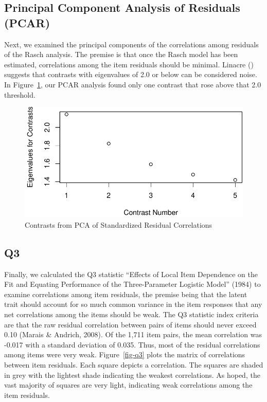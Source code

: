 \documentclass[
  letterpaper,
  DIV=11,
  numbers=noendperiod]{scrreport}
\begin{document}
\hypertarget{principal-component-analysis-of-residuals-pcar}{%
\subsection*{Principal Component Analysis of Residuals
(PCAR)}\label{principal-component-analysis-of-residuals-pcar}}

Next, we examined the principal components of the correlations among
residuals of the Rasch analysis. The premise is that once the Rasch
model has been estimated, correlations among the item residuals should
be minimal. Linacre () suggests that contrasts with eigenvalues of 2.0
or below can be considered noise. In Figure~\ref{fig-pcar}, our PCAR
analysis found only one contrast that rose above that 2.0 threshold.

\begin{figure}

{\centering \includegraphics{./results_files/figure-pdf/fig-pcar-1.pdf}

}

\caption{\label{fig-pcar}Contrasts from PCA of Standardized Residual
Correlations}

\end{figure}

\hypertarget{q3}{%
\subsection*{Q3}\label{q3}}

Finally, we calculated the Q3 statistic {``Effects of Local Item
Dependence on the Fit and Equating Performance of the Three-Parameter
Logistic Model''} (1984) to examine correlations among item residuals,
the premise being that the latent trait should account for so much
common variance in the item responses that any net correlations among
the items should be weak. The Q3 statistic index criteria are that the
raw residual correlation between pairs of items should never exceed 0.10
(Marais \& Andrich, 2008). Of the 1,711 item pairs, the mean correlation
was -0.017 with a standard deviation of 0.035. Thus, most of the
residual correlations among items were very weak. Figure~\ref{fig-q3}
plots the matrix of correlations between item residuals. Each square
depicts a correlation. The squares are shaded in grey with the lightest
shade indicating the weakest correlations. As hoped, the vast majority
of squares are very light, indicating weak correlations among the item
residuals.
\end{document}

